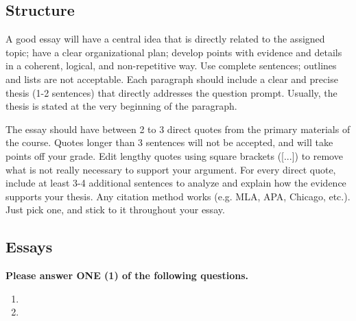 \documentclass{article}
\begin{document}
\subsection*{Structure}

A good essay will have a central idea that is directly related to the assigned topic; have a clear organizational plan; develop points with evidence and details in a coherent, logical, and non-repetitive way. Use complete sentences; outlines and lists are not acceptable. Each paragraph should include a clear and precise thesis (1-2 sentences) that directly addresses the question prompt. Usually, the thesis is stated at the very beginning of the paragraph.

The essay should have between 2 to 3 direct quotes from the primary materials of the course. Quotes longer than 3 sentences will not be accepted, and will take points off your grade. Edit lengthy quotes using square brackets ([...]) to remove what is not really necessary to support your argument. For every direct quote, include at least 3-4 additional sentences to analyze and explain how the evidence supports your thesis. Any citation method works (e.g. MLA, APA, Chicago, etc.). Just pick one, and stick to it throughout your essay.


\subsection*{Essays}

{\bf Please answer ONE (1) of the following questions.} 


\begin{enumerate}
    \item {\unskip} 
    \item {\unskip}
\end{enumerate}
\end{document}
